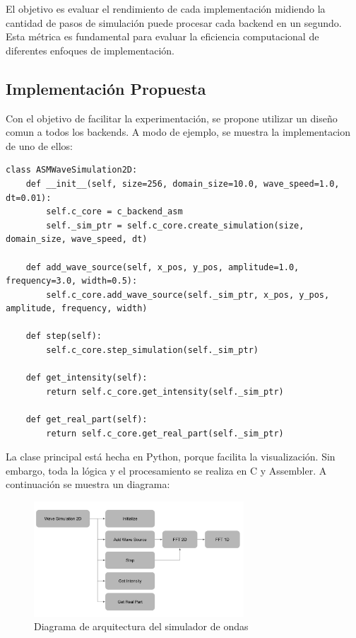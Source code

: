 \documentclass[a4paper]{article}
\begin{document}
El objetivo es evaluar el rendimiento de cada implementación midiendo la cantidad de pasos de simulación puede procesar cada backend en un segundo. Esta métrica es fundamental para evaluar la eficiencia computacional de diferentes enfoques de implementación.

\subsection{Implementación Propuesta}
Con el objetivo de facilitar la experimentación, se propone utilizar un diseño comun a todos los backends. A modo de ejemplo, se muestra
la implementacion de uno de ellos:

\begin{verbatim}
class ASMWaveSimulation2D:
    def __init__(self, size=256, domain_size=10.0, wave_speed=1.0, dt=0.01):
        self.c_core = c_backend_asm
        self._sim_ptr = self.c_core.create_simulation(size, domain_size, wave_speed, dt)
    
    def add_wave_source(self, x_pos, y_pos, amplitude=1.0, frequency=3.0, width=0.5):
        self.c_core.add_wave_source(self._sim_ptr, x_pos, y_pos, amplitude, frequency, width)
    
    def step(self):
        self.c_core.step_simulation(self._sim_ptr)
    
    def get_intensity(self):
        return self.c_core.get_intensity(self._sim_ptr)
    
    def get_real_part(self):
        return self.c_core.get_real_part(self._sim_ptr)
\end{verbatim}

La clase principal está hecha en Python, porque facilita la visualización. Sin embargo, toda la lógica y el procesamiento se realiza en C y Assembler. A continuación se muestra un diagrama:

\begin{figure}[h]
    \centering
    \includegraphics[width=0.7\textwidth]{extra/diagram.png}
    \caption{Diagrama de arquitectura del simulador de ondas}
    \label{fig:wave_sim_architecture}
\end{figure}
\end{document}

